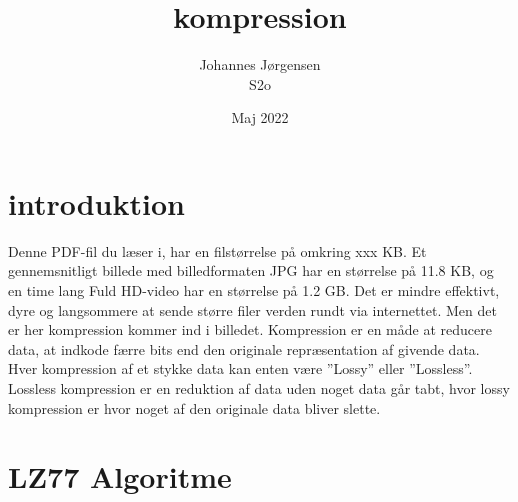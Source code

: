 \documentclass[12pt]{article}
\begin{document}
\title{kompression}
\author{Johannes Jørgensen\\ S2o}
\date{Maj 2022}
\maketitle
\pagebreak
\tableofcontents
\pagebreak

\section{introduktion}
Denne PDF-fil du læser i, har en filstørrelse på omkring xxx KB. 
Et gennemsnitligt billede med billedformaten JPG har en størrelse på 11.8 KB,\cite*{Solarwinds/filesizes} og en time lang Fuld HD-video har en størrelse på 1.2 GB.\cite*{filecatalyst/movesizes} 
Det er mindre effektivt, dyre og langsommere at sende større filer verden rundt via internettet. Men det er her kompression kommer ind i billedet. 
Kompression er en måde at reducere data, at indkode færre bits end den originale repræsentation af givende data. Hver kompression af et stykke data kan enten være ”Lossy” eller ”Lossless”.\cite*{Wiki/dataCompression} 
Lossless kompression er en reduktion af data uden noget data går tabt, hvor lossy kompression er hvor noget af den originale data bliver slette.
\section{LZ77 Algoritme}
\end{document}
